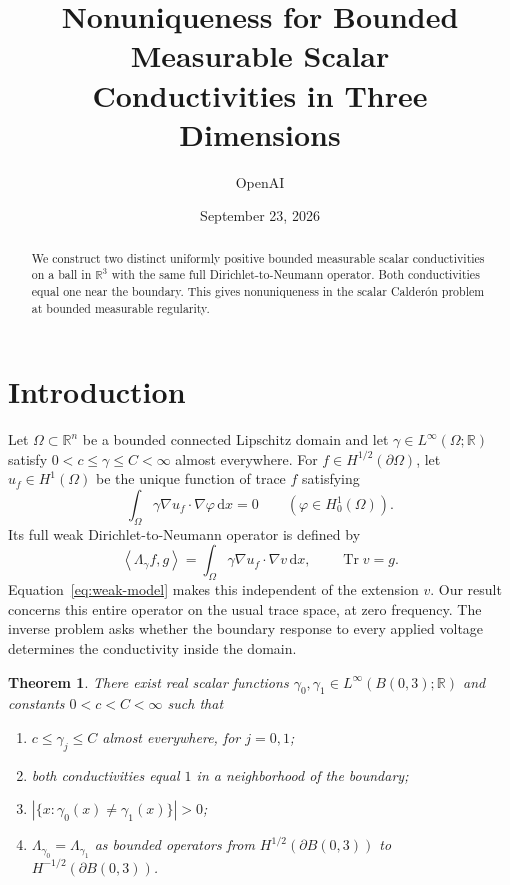 \documentclass[11pt]{article}
\title{Nonuniqueness for Bounded Measurable Scalar\\ Conductivities in Three Dimensions}
\author{OpenAI}
\date{September 23, 2026}
\numberwithin{equation}{section}
\newtheorem{theorem}{Theorem}[section]
\theoremstyle{definition}
\theoremstyle{remark}
\newcommand{\R}{\mathbb R}
\newcommand{\dd}{\,\mathrm d}
\newcommand{\abs}[1]{\left\lvert #1\right\rvert}
\newcommand{\ip}[2]{\left\langle #1,#2\right\rangle}
\begin{document}
\maketitle
\begin{abstract}
We construct two distinct uniformly positive bounded measurable scalar
conductivities on a ball in $\R^3$ with the same full
Dirichlet-to-Neumann operator. Both conductivities equal one near the
boundary. This gives nonuniqueness in the scalar Calder\'on problem at
bounded measurable regularity.
\end{abstract}

\section{Introduction}\label{sec:introduction}

Let $\Omega\subset\R^n$ be a bounded connected Lipschitz domain and
let $\gamma\in L^\infty(\Omega;\R)$ satisfy
$0<c\leq\gamma\leq C<\infty$ almost everywhere. For
$f\in H^{1/2}(\partial\Omega)$, let $u_f\in H^1(\Omega)$ be the
unique function of trace $f$ satisfying
\begin{equation}\label{eq:weak-model}
 \int_\Omega\gamma\nabla u_f\cdot\nabla\varphi\dd x=0
 \qquad(\varphi\in H^1_0(\Omega)).
\end{equation}
Its full weak Dirichlet-to-Neumann operator is defined by
\begin{equation}\label{eq:dn-definition}
 \ip{\Lambda_\gamma f}{g}
 =\int_\Omega\gamma\nabla u_f\cdot\nabla v\dd x,
 \qquad \operatorname{Tr}v=g.
\end{equation}
Equation~\eqref{eq:weak-model} makes this independent of the
extension $v$. Our result concerns this entire operator on the usual
trace space, at zero frequency.
The inverse problem asks whether the boundary response to every applied
voltage determines the conductivity inside the domain.

\begin{theorem}\label{thm:main}
There exist real scalar functions $\gamma_0,\gamma_1\in
L^\infty(B(0,3);\R)$ and constants $0<c<C<\infty$ such that
\begin{enumerate}[label=\textup{(\roman*)},itemsep=2pt]
\item $c\leq\gamma_j\leq C$ almost everywhere, for $j=0,1$;
\item both conductivities equal $1$ in a neighborhood of the boundary;
\item $\abs{\{x:\gamma_0(x)\ne\gamma_1(x)\}}>0$;
\item $\Lambda_{\gamma_0}=\Lambda_{\gamma_1}$ as bounded operators
from $H^{1/2}(\partial B(0,3))$ to $H^{-1/2}(\partial B(0,3))$.
\end{enumerate}
\end{theorem}
\end{document}
